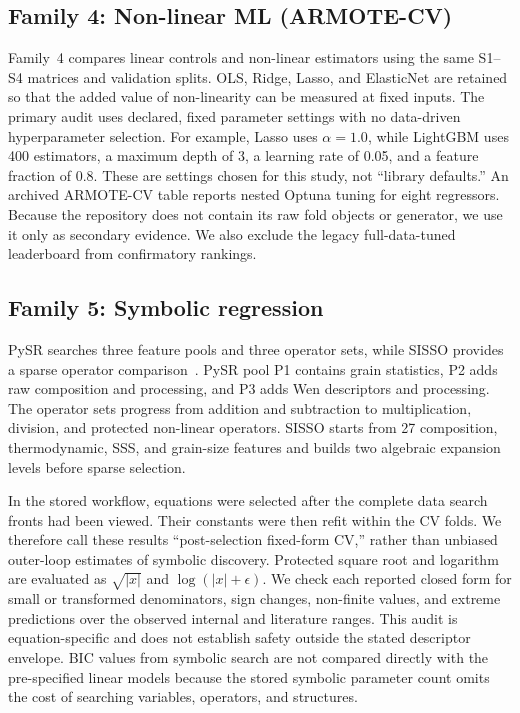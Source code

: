 \documentclass[5p,times,twocolumn]{elsarticle}
\newcommand{\familyfour}{Non-linear ML (ARMOTE-CV)}
\newcommand{\familyfive}{Symbolic regression}
\begin{document}
\subsection{Family 4: \familyfour}

Family~4 compares linear controls and non-linear estimators using the same S1--S4 matrices and validation splits. OLS, Ridge, Lasso, and ElasticNet are retained so that the added value of non-linearity can be measured at fixed inputs. The primary audit uses declared, fixed parameter settings with no data-driven hyperparameter selection. For example, Lasso uses $\alpha=1.0$, while LightGBM uses 400 estimators, a maximum depth of 3, a learning rate of 0.05, and a feature fraction of 0.8. These are settings chosen for this study, not ``library defaults.'' An archived ARMOTE-CV table reports nested Optuna tuning for eight regressors. Because the repository does not contain its raw fold objects or generator, we use it only as secondary evidence. We also exclude the legacy full-data-tuned leaderboard from confirmatory rankings.

\subsection{Family 5: \familyfive}

PySR searches three feature pools and three operator sets, while SISSO provides a sparse operator comparison~\cite{Cranmer2023PySR,Ouyang2018SISSO}. PySR pool P1 contains grain statistics, P2 adds raw composition and processing, and P3 adds Wen descriptors and processing. The operator sets progress from addition and subtraction to multiplication, division, and protected non-linear operators. SISSO starts from 27 composition, thermodynamic, SSS, and grain-size features and builds two algebraic expansion levels before sparse selection.

In the stored workflow, equations were selected after the complete data search fronts had been viewed. Their constants were then refit within the CV folds. We therefore call these results ``post-selection fixed-form CV,'' rather than unbiased outer-loop estimates of symbolic discovery. Protected square root and logarithm are evaluated as $\sqrt{|x|}$ and $\log(|x|+\epsilon)$. We check each reported closed form for small or transformed denominators, sign changes, non-finite values, and extreme predictions over the observed internal and literature ranges. This audit is equation-specific and does not establish safety outside the stated descriptor envelope. BIC values from symbolic search are not compared directly with the pre-specified linear models because the stored symbolic parameter count omits the cost of searching variables, operators, and structures.
\end{document}
